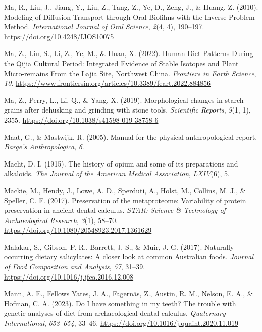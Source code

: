 \documentclass[
  letterpaper,
]{book}
\newlength{\cslhangindent}
\newlength{\cslentryspacingunit} %
\newenvironment{CSLReferences}[2] %
 {%
  \setlength{\parindent}{0pt}
  \ifodd #1
  \let\oldpar\par
  \def\par{\hangindent=\cslhangindent\oldpar}
  \fi
  \setlength{\parskip}{#2\cslentryspacingunit}
 }%
 {}
\begin{document}
\begin{CSLReferences}{1}{0}
\leavevmode{}%
Ma, R., Liu, J., Jiang, Y., Liu, Z., Tang, Z., Ye, D., Zeng, J., \&
Huang, Z. (2010). Modeling of {Diffusion Transport} through {Oral
Biofilms} with the {Inverse Problem Method}. \emph{International Journal
of Oral Science}, \emph{2}(4, 4), 190--197.
\url{https://doi.org/10.4248/IJOS10075}

\leavevmode{}%
Ma, Z., Liu, S., Li, Z., Ye, M., \& Huan, X. (2022). Human {Diet
Patterns During} the {Qijia Cultural Period}: {Integrated Evidence} of
{Stable Isotopes} and {Plant Micro-remains From} the {Lajia Site},
{Northwest China}. \emph{Frontiers in Earth Science}, \emph{10}.
\url{https://www.frontiersin.org/articles/10.3389/feart.2022.884856}

\leavevmode{}%
Ma, Z., Perry, L., Li, Q., \& Yang, X. (2019). Morphological changes in
starch grains after dehusking and grinding with stone tools.
\emph{Scientific Reports}, \emph{9}(1, 1), 2355.
\url{https://doi.org/10.1038/s41598-019-38758-6}

\leavevmode{}%
Maat, G., \& Mastwijk, R. (2005). Manual for the physical
anthropological report. \emph{Barge's Anthropologica}, \emph{6}.

\leavevmode{}%
Macht, D. I. (1915). The history of opium and some of its preparations
and alkaloids. \emph{The Journal of the American Medical Association},
\emph{LXIV}(6), 5.

\leavevmode{}%
Mackie, M., Hendy, J., Lowe, A. D., Sperduti, A., Holst, M., Collins, M.
J., \& Speller, C. F. (2017). Preservation of the metaproteome:
Variability of protein preservation in ancient dental calculus.
\emph{STAR: Science \& Technology of Archaeological Research},
\emph{3}(1), 58--70. \url{https://doi.org/10.1080/20548923.2017.1361629}

\leavevmode{}%
Malakar, S., Gibson, P. R., Barrett, J. S., \& Muir, J. G. (2017).
Naturally occurring dietary salicylates: {A} closer look at common
{Australian} foods. \emph{Journal of Food Composition and Analysis},
\emph{57}, 31--39. \url{https://doi.org/10.1016/j.jfca.2016.12.008}

\leavevmode{}%
Mann, A. E., Fellows Yates, J. A., Fagernäs, Z., Austin, R. M., Nelson,
E. A., \& Hofman, C. A. (2023). Do {I} have something in my teeth? {The}
trouble with genetic analyses of diet from archaeological dental
calculus. \emph{Quaternary International}, \emph{653--654}, 33--46.
\url{https://doi.org/10.1016/j.quaint.2020.11.019}


\end{CSLReferences}
\end{document}
